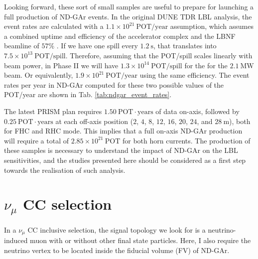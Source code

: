 Looking forward, these sort of small samples are useful to prepare for launching a full production of ND-GAr events. In the original DUNE TDR LBL analysis, the event rates are calculated with a $1.1 \times 10^{21} ~ \mathrm{POT}/\mathrm{year}$ assumption, which assumes a combined uptime and efficiency of the accelerator complex and the LBNF beamline of $57\%$ \cite{DUNE2020}. If we have one spill every $1.2~\mathrm{s}$, that translates into $7.5 \times 10^{13} ~ \mathrm{POT}/\mathrm{spill}$. Therefore, assuming that the POT/spill scales linearly with beam power, in Phase II we will have $1.3 \times 10^{14} ~ \mathrm{POT}/\mathrm{spill}$ for the for the $2.1 ~ \mathrm{MW}$ beam. Or equivalently, $1.9 \times 10^{21} ~ \mathrm{POT}/\mathrm{year}$ using the same efficiency. The event rates per year in ND-GAr computed for these two possible values of the POT/year are shown in Tab. \ref{tab:ndgar_event_rates}.

The latest PRISM plan requires $1.50 ~ \mathrm{POT} \cdot \mathrm{years}$ of data on-axis, followed by $0.25 ~ \mathrm{POT} \cdot \mathrm{years}$ at each off-axis position ($2$, $4$, $8$, $12$, $16$, $20$, $24$, and $28~\mathrm{m}$), both for FHC and RHC mode. This implies that a full on-axis ND-GAr production will require a total of $2.85 \times 10^{21}~\mathrm{POT}$ for both horn currents. The production of these samples is necessary to understand the impact of ND-GAr on the LBL sensitivities, and the studies presented here should be considered as a first step towards the realisation of such analysis.

\section[\texorpdfstring{$\nu_{\mu}$}{numu} CC selection]{\boldmath\texorpdfstring{$\nu_{\mu}$}{numu} CC selection}

In a $\nu_{\mu}$ CC inclusive selection, the signal topology we look for is a neutrino-induced muon with or without other final state particles. Here, I also require the neutrino vertex to be located inside the fiducial volume (FV) of ND-GAr.

